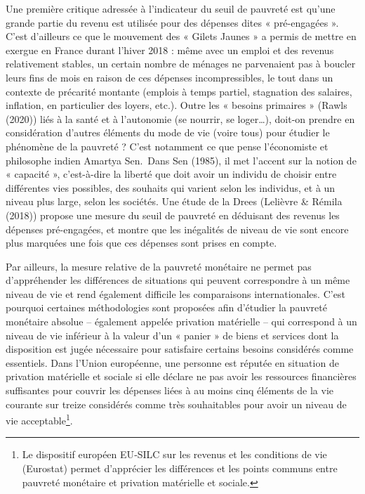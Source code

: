 \documentclass[12pt,a4paper]{reedthesis}
\begin{document}
Une première critique adressée à l'indicateur du seuil de pauvreté est qu'une grande partie du revenu est utilisée pour des dépenses dites « pré-engagées ». C'est d'ailleurs ce que le mouvement des « Gilets Jaunes » a permis de mettre en exergue en France durant l'hiver 2018 : même avec un emploi et des revenus relativement stables, un certain nombre de ménages ne parvenaient pas à boucler leurs fins de mois en raison de ces dépenses incompressibles, le tout dans un contexte de précarité montante (emplois à temps partiel, stagnation des salaires, inflation, en particulier des loyers, etc.). Outre les « besoins primaires » (Rawls (2020)) liés à la santé et à l'autonomie (se nourrir, se loger\ldots), doit-on prendre en considération d'autres éléments du mode de vie (voire tous) pour étudier le phénomène de la pauvreté ? C'est notamment ce que pense l'économiste et philosophe indien Amartya Sen.~Dans Sen (1985), il met l'accent sur la notion de « capacité », c'est-à-dire la liberté que doit avoir un individu de choisir entre différentes vies possibles, des souhaits qui varient selon les individus, et à un niveau plus large, selon les sociétés. Une étude de la Drees (Lelièvre \& Rémila (2018)) propose une mesure du seuil de pauvreté en déduisant des revenus les dépenses pré-engagées, et montre que les inégalités de niveau de vie sont encore plus marquées une fois que ces dépenses sont prises en compte.

Par ailleurs, la mesure relative de la pauvreté monétaire ne permet pas d'appréhender les différences de situations qui peuvent correspondre à un même niveau de vie et rend également difficile les comparaisons internationales. C'est pourquoi certaines méthodologies sont proposées afin d'étudier la pauvreté monétaire absolue -- également appelée privation matérielle -- qui correspond à un niveau de vie inférieur à la valeur d'un « panier » de biens et services dont la disposition est jugée nécessaire pour satisfaire certains besoins considérés comme essentiels. Dans l'Union européenne, une personne est réputée en situation de privation matérielle et sociale si elle déclare ne pas avoir les ressources financières suffisantes pour couvrir les dépenses liées à au moins cinq éléments de la vie courante sur treize considérés comme très souhaitables pour avoir un niveau de vie acceptable\footnote{Le dispositif européen EU‑SILC sur les revenus et les conditions de vie (Eurostat) permet d'apprécier les différences et les points communs entre pauvreté monétaire et privation matérielle et sociale.}.
\end{document}

